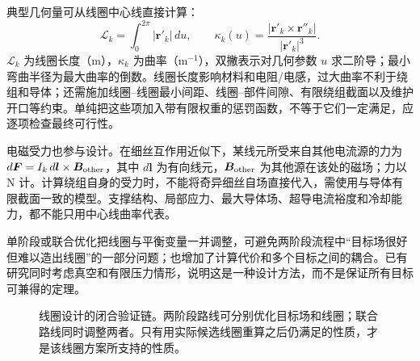 \documentclass[12pt,fontset=none]{ctexart}
\numberwithin{equation}{section}
\numberwithin{table}{section}
\numberwithin{figure}{section}
\begin{document}
典型几何量可从线圈中心线直接计算：
\begin{equation}\label{eq:stellarator-geometry}
 \mathcal L_k=\int_0^{2\pi}|\bm r'_k|\,du,\qquad
 \kappa_k(u)=\frac{|\bm r'_k\times\bm r''_k|}{|\bm r'_k|^3}.
\end{equation}
$\mathcal L_k$ 为线圈长度（m），$\kappa_k$ 为曲率（$\mathrm{m^{-1}}$），双撇表示对几何参数 $u$ 求二阶导；最小弯曲半径为最大曲率的倒数。线圈长度影响材料和电阻/电感，过大曲率不利于绕组和导体；还需施加线圈--线圈最小间距、线圈--部件间隙、有限绕组截面以及维护开口等约束。单纯把这些项加入带有限权重的惩罚函数，不等于它们一定满足，应逐项检查最终可行性。

电磁受力也参与设计。在细丝互作用近似下，某线元所受来自其他电流源的力为 $d\bm F=I_k\,d\bm l\times\bm B_{\rm other}$，其中 $d\bm l$ 为有向线元，$\bm B_{\rm other}$ 为其他源在该处的磁场；力以 N 计。计算绕组自身的受力时，不能将奇异细丝自场直接代入，需使用与导体有限截面一致的模型。支撑结构、局部应力、最大导体场、超导电流裕度和冷却能力，都不能只用中心线曲率代表。

单阶段或联合优化把线圈与平衡变量一并调整，可避免两阶段流程中``目标场很好但难以造出线圈''的一部分问题；也增加了计算代价和多个目标之间的耦合。已有研究同时考虑真空和有限压力情形，说明这是一种设计方法，而不是保证所有目标可兼得的定理\cite{Ssingle}。

\begin{figure}[htbp]
\centering
{}
\caption{线圈设计的闭合验证链。两阶段路线可分别优化目标场和线圈；联合路线同时调整两者。只有用实际候选线圈重算之后仍满足的性质，才是该线圈方案所支持的性质。}\label{fig:stellarator-design}
\end{figure}
\end{document}

